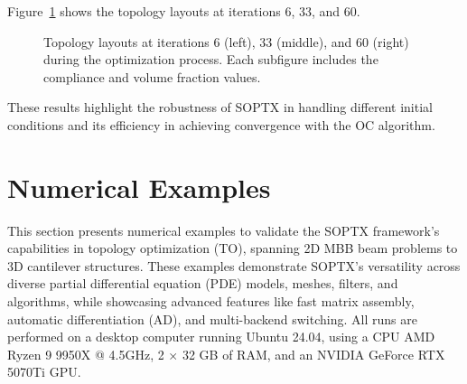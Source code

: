 \documentclass[mathpazo]{cicp}
\begin{document}
Figure~\ref{fig:canti_1_all} shows the topology layouts at iterations 6, 33, and 60.
\begin{figure}[htb]
	\centering
	\caption{Topology layouts at iterations 6 (left), 33 (middle), and 60 (right) during the optimization process. Each subfigure includes the compliance and volume fraction values.}
	\label{fig:canti_1_all}
\end{figure}

These results highlight the robustness of SOPTX in handling different initial conditions and its efficiency in achieving convergence with the OC algorithm.

\section{Numerical Examples}
This section presents numerical examples to validate the SOPTX framework's capabilities in topology optimization (TO), spanning 2D MBB beam problems to 3D cantilever structures. These examples demonstrate SOPTX's versatility across diverse partial differential equation (PDE) models, meshes, filters, and algorithms, while showcasing advanced features like fast matrix assembly, automatic differentiation (AD), and multi-backend switching. All runs are performed on a desktop computer running Ubuntu 24.04, using a CPU AMD Ryzen 9 9950X @ 4.5GHz, 2 × 32 GB of RAM, and an NVIDIA GeForce RTX 5070Ti GPU.
\end{document}
